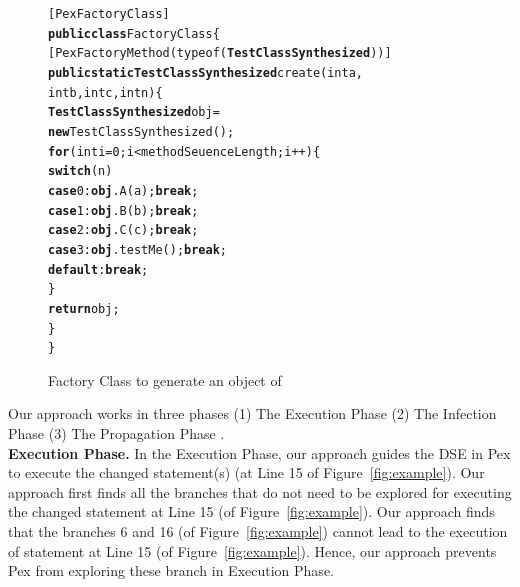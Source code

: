 {\begin{figure}[t]
\begin{CodeOut}
\begin{alltt}
  [PexFactoryClass]
  \textbf{public class} FactoryClass\{
  \hspace{0.5cm}[PexFactoryMethod(typeof(\textbf{TestClassSynthesized}))]
  \hspace{0.5cm}\textbf{public static TestClassSynthesized} create(int a, 
  \hspace{1.5cm}int b, int c, int n)\{
  \hspace{1.0cm}\textbf{TestClassSynthesized} obj = 
  \hspace{1.5cm}\textbf{new} TestClassSynthesized(); 
  \hspace{1.0cm} \textbf{for}(int i=0; i< methodSeuenceLength; i++)\{
  \hspace{1.5cm} \textbf{switch}(n)
  \hspace{2.0cm} \textbf{case} 0: \textbf{obj}.A(a);\textbf{break};
  \hspace{2.0cm} \textbf{case} 1: \textbf{obj}.B(b);\textbf{break};
  \hspace{2.0cm} \textbf{case} 2: \textbf{obj}.C(c);\textbf{break};
  \hspace{2.0cm} \textbf{case} 3: \textbf{obj}.testMe();\textbf{break};
  \hspace{2.0cm} \textbf{default}: \textbf{break};
  \hspace{1.0cm}\}
  \hspace{1.5cm} \textbf{return} obj;
  \hspace{0.5cm}\}
  \}
\end{alltt}
\end{CodeOut}
\vspace{-0.15 in}
\caption{Factory Class to generate an object of }
\label{fig:factory}
\end{figure}

Our approach works in three phases (1) The Execution Phase (2) The Infection Phase (3) The Propagation Phase . 
\\ \textbf{Execution Phase.} In the Execution Phase, our approach guides the DSE in Pex to execute the changed statement(s) (at Line 15 of Figure~\ref{fig:example}). Our approach first finds all the branches that do not need to be explored for executing the changed statement at Line 15 (of Figure~\ref{fig:example}).  Our approach finds that the branches 6 and 16 (of Figure~\ref{fig:example}) cannot lead to the execution of statement at Line 15 (of Figure~\ref{fig:example}). Hence, our approach prevents Pex from exploring these branch in Execution Phase. 
 
}
